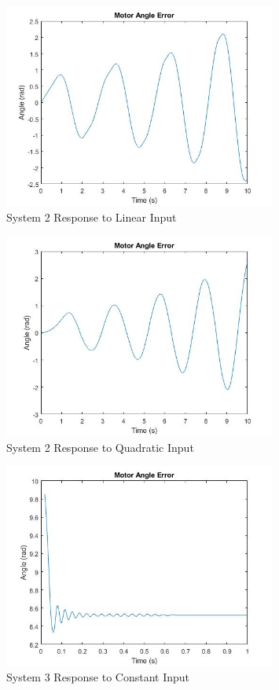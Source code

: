 \begin{figure}[H]
        \centering
        \includegraphics[width=0.8\textwidth]{./figures/lab4_fig11-part4-3-3-error-rc-I=1-linear.jpg}
        \caption{System 2 Response to Linear Input}
        \label{fig:system2_linear}
\end{figure}

\begin{figure}[H]
        \centering
        \includegraphics[width=0.8\textwidth]{./figures/lab4_fig12-part4-3-3-error-rc-I=1-quadratic.jpg}
        \caption{System 2 Response to Quadratic Input}
        \label{fig:system2_quadratic}
\end{figure}

\begin{figure}[H]
        \centering
        \includegraphics[width=0.8\textwidth]{./figures/lab4_fig13-part4-3-3-error-rc-D=1-constant.jpg}
        \caption{System 3 Response to Constant Input}
        \label{fig:system3_constant}
\end{figure}

